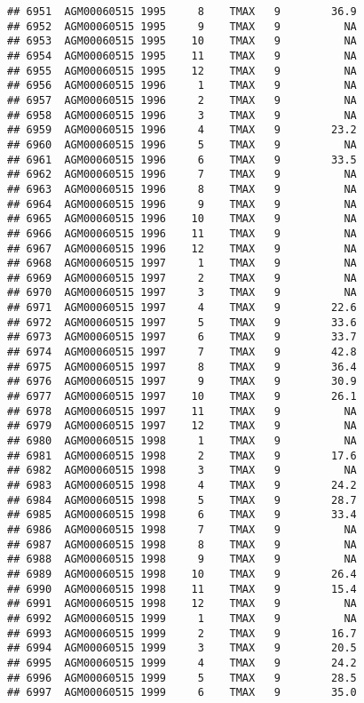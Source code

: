 \documentclass{article}\usepackage[]{graphicx}\usepackage[]{color}
\makeatletter
\newenvironment{kframe}{%
 \def\at@end@of@kframe{}%
 \ifinner\ifhmode%
  \def\at@end@of@kframe{\end{minipage}}%
  \begin{minipage}{\columnwidth}%
 \fi\fi%
 \def\FrameCommand##1{\hskip\@totalleftmargin \hskip-\fboxsep
 \colorbox{shadecolor}{##1}\hskip-\fboxsep
     \hskip-\linewidth \hskip-\@totalleftmargin \hskip\columnwidth}%
 \MakeFramed {\advance\hsize-\width
   \@totalleftmargin\z@ \linewidth\hsize
   \@setminipage}}%
 {\par\unskip\endMakeFramed%
 \at@end@of@kframe}
\newenvironment{knitrout}{}{} %
\makeatother
\begin{document}
\begin{knitrout}
\begin{kframe}
\begin{verbatim}
## 6951  AGM00060515 1995     8    TMAX   9        36.9
## 6952  AGM00060515 1995     9    TMAX   9          NA
## 6953  AGM00060515 1995    10    TMAX   9          NA
## 6954  AGM00060515 1995    11    TMAX   9          NA
## 6955  AGM00060515 1995    12    TMAX   9          NA
## 6956  AGM00060515 1996     1    TMAX   9          NA
## 6957  AGM00060515 1996     2    TMAX   9          NA
## 6958  AGM00060515 1996     3    TMAX   9          NA
## 6959  AGM00060515 1996     4    TMAX   9        23.2
## 6960  AGM00060515 1996     5    TMAX   9          NA
## 6961  AGM00060515 1996     6    TMAX   9        33.5
## 6962  AGM00060515 1996     7    TMAX   9          NA
## 6963  AGM00060515 1996     8    TMAX   9          NA
## 6964  AGM00060515 1996     9    TMAX   9          NA
## 6965  AGM00060515 1996    10    TMAX   9          NA
## 6966  AGM00060515 1996    11    TMAX   9          NA
## 6967  AGM00060515 1996    12    TMAX   9          NA
## 6968  AGM00060515 1997     1    TMAX   9          NA
## 6969  AGM00060515 1997     2    TMAX   9          NA
## 6970  AGM00060515 1997     3    TMAX   9          NA
## 6971  AGM00060515 1997     4    TMAX   9        22.6
## 6972  AGM00060515 1997     5    TMAX   9        33.6
## 6973  AGM00060515 1997     6    TMAX   9        33.7
## 6974  AGM00060515 1997     7    TMAX   9        42.8
## 6975  AGM00060515 1997     8    TMAX   9        36.4
## 6976  AGM00060515 1997     9    TMAX   9        30.9
## 6977  AGM00060515 1997    10    TMAX   9        26.1
## 6978  AGM00060515 1997    11    TMAX   9          NA
## 6979  AGM00060515 1997    12    TMAX   9          NA
## 6980  AGM00060515 1998     1    TMAX   9          NA
## 6981  AGM00060515 1998     2    TMAX   9        17.6
## 6982  AGM00060515 1998     3    TMAX   9          NA
## 6983  AGM00060515 1998     4    TMAX   9        24.2
## 6984  AGM00060515 1998     5    TMAX   9        28.7
## 6985  AGM00060515 1998     6    TMAX   9        33.4
## 6986  AGM00060515 1998     7    TMAX   9          NA
## 6987  AGM00060515 1998     8    TMAX   9          NA
## 6988  AGM00060515 1998     9    TMAX   9          NA
## 6989  AGM00060515 1998    10    TMAX   9        26.4
## 6990  AGM00060515 1998    11    TMAX   9        15.4
## 6991  AGM00060515 1998    12    TMAX   9          NA
## 6992  AGM00060515 1999     1    TMAX   9          NA
## 6993  AGM00060515 1999     2    TMAX   9        16.7
## 6994  AGM00060515 1999     3    TMAX   9        20.5
## 6995  AGM00060515 1999     4    TMAX   9        24.2
## 6996  AGM00060515 1999     5    TMAX   9        28.5
## 6997  AGM00060515 1999     6    TMAX   9        35.0

\end{verbatim}
\end{kframe}
\end{knitrout}
\end{document}
